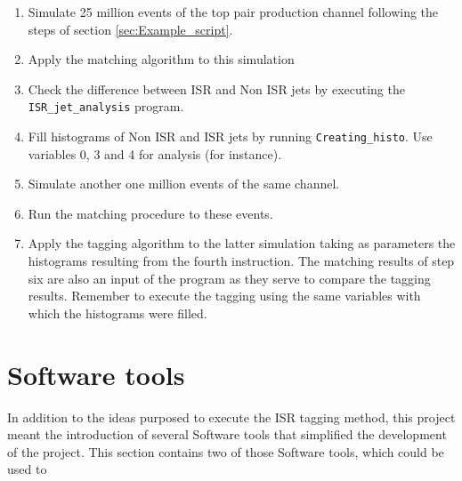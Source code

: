 \documentclass[12pt, oneside]{book}              %
\begin{document}
\begin{enumerate}
\item Simulate 25 million events of the top pair production channel
following the steps of section \ref{sec:Example_script}.
\item Apply the matching algorithm to this simulation
\item Check the difference between ISR and Non ISR jets by executing
the \texttt{ISR\_jet\_analysis} program.
\item Fill histograms of Non ISR and ISR jets by running \texttt{Creating\_histo}.
Use variables 0, 3 and 4 for analysis (for instance).
\item Simulate another one million events of the same channel.
\item Run the matching procedure to these events.
\item Apply the tagging algorithm to the latter simulation taking
as parameters the histograms resulting from the fourth instruction. The
matching results of step six are also an input of the program as they serve
to compare the tagging results. Remember to execute the tagging using
the same variables with which the histograms were filled.
\end{enumerate}

\chapter{Software tools} \label{cha:Software_tools}

In addition to the ideas purposed to execute the ISR tagging method,
this project meant the introduction of several Software tools that
simplified the development of the project. This section contains
two of those Software tools, which could be used to 
\end{document}
